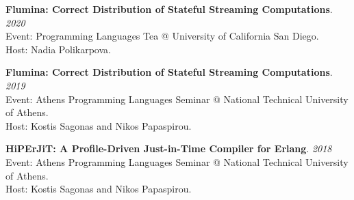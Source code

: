 \begin{minipage}{\textwidth}
\textbf{Flumina: Correct Distribution of Stateful Streaming Computations}. \hfill {\em 2020}\\
Event: Programming Languages Tea @ University of California San Diego.\\
 Host: Nadia Polikarpova.
\end{minipage}

\begin{minipage}{\textwidth}
\textbf{Flumina: Correct Distribution of Stateful Streaming Computations}. \hfill {\em 2019}\\
Event: Athens Programming Languages Seminar @ National Technical University of Athens.\\
 Host: Kostis Sagonas and Nikos Papaspirou.
\end{minipage}

\begin{minipage}{\textwidth}
\textbf{HiPErJiT: A Profile-Driven Just-in-Time Compiler for Erlang}. \hfill {\em 2018}\\
Event: Athens Programming Languages Seminar @ National Technical University of Athens.\\
 Host: Kostis Sagonas and Nikos Papaspirou.
\end{minipage}


